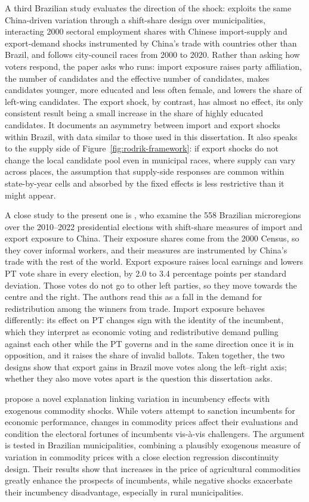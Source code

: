 \documentclass[
	11pt,				%
	oneside,			%
	a4paper,			%
	english,			%
	english				%
	]{abntex2ppgsi}
\theoremstyle{plain}
\theoremstyle{remark}
\theoremstyle{plain}%
\theoremstyle{remark}%
\begin{document}
A third Brazilian study evaluates the direction of the shock:  exploits the same China-driven variation through a shift-share design over municipalities, interacting 2000 sectoral employment shares with Chinese import-supply and export-demand shocks instrumented by China's trade with countries other than Brazil, and follows city-council races from 2000 to 2020. Rather than asking how voters respond, the paper asks who runs: import exposure raises party affiliation, the number of candidates and the effective number of candidates, makes candidates younger, more educated and less often female, and lowers the share of left-wing candidates. The export shock, by contrast, has almost no effect, its only consistent result being a small increase in the share of highly educated candidates. It documents an asymmetry between import and export shocks within Brazil, with data similar to those used in this dissertation. It also speaks to the supply side of Figure~\ref{fig:rodrik-framework}: if export shocks do not change the local candidate pool even in municipal races, where supply can vary across places, the assumption that supply-side responses are common within state-by-year cells and absorbed by the fixed effects is less restrictive than it might appear.

A close study to the present one is , who examine the 558 Brazilian microregions over the 2010--2022 presidential elections with shift-share measures of import and export exposure to China. Their exposure shares come from the 2000 Census, so they cover informal workers, and their measures are instrumented by China's trade with the rest of the world. Export exposure raises local earnings and lowers PT vote share in every election, by 2.0 to 3.4 percentage points per standard deviation. Those votes do not go to other left parties, so they move towards the centre and the right. The authors read this as a fall in the demand for redistribution among the winners from trade. Import exposure behaves differently: its effect on PT changes sign with the identity of the incumbent, which they interpret as economic voting and redistributive demand pulling against each other while the PT governs and in the same direction once it is in opposition, and it raises the share of invalid ballots. Taken together, the two designs show that export gains in Brazil move votes along the left--right axis; whether they also move votes apart is the question this dissertation asks.

 propose a novel explanation linking variation in incumbency effects with exogenous commodity shocks. While voters attempt to sanction incumbents for economic performance, changes in commodity prices affect their evaluations and condition the electoral fortunes of incumbents vis-à-vis challengers. The argument is tested in Brazilian municipalities, combining a plausibly exogenous measure of variation in commodity prices with a close election regression discontinuity design. Their results show that increases in the price of agricultural commodities greatly enhance the prospects of incumbents, while negative shocks exacerbate their incumbency disadvantage, especially in rural municipalities. 
\end{document}
